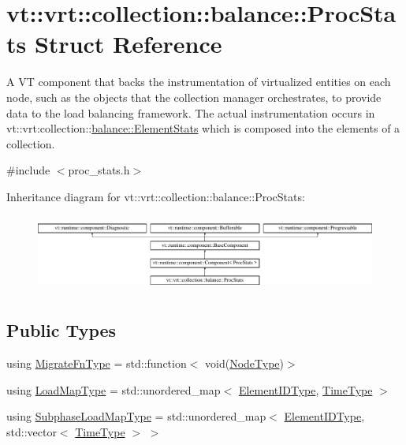 \hypertarget{structvt_1_1vrt_1_1collection_1_1balance_1_1_proc_stats}{}\section{vt\+:\+:vrt\+:\+:collection\+:\+:balance\+:\+:Proc\+Stats Struct Reference}
\label{structvt_1_1vrt_1_1collection_1_1balance_1_1_proc_stats}


A VT component that backs the instrumentation of virtualized entities on each node, such as the objects that the collection manager orchestrates, to provide data to the load balancing framework. The actual instrumentation occurs in {\ttfamily vt\+::vrt\+:collection\+:}\+:\hyperlink{structvt_1_1vrt_1_1collection_1_1balance_1_1_element_stats}{balance\+::\+Element\+Stats} which is composed into the elements of a collection.  




{\ttfamily \#include $<$proc\+\_\+stats.\+h$>$}

Inheritance diagram for vt\+:\+:vrt\+:\+:collection\+:\+:balance\+:\+:Proc\+Stats\+:\begin{figure}[H]
\begin{center}
\leavevmode
\includegraphics[height=2.565865cm]{structvt_1_1vrt_1_1collection_1_1balance_1_1_proc_stats}
\end{center}
\end{figure}
\subsection*{Public Types}
\begin{DoxyCompactItemize}
\item 
using \hyperlink{structvt_1_1vrt_1_1collection_1_1balance_1_1_proc_stats_a7cb065ac4de218cb717bc2634782f0cb}{Migrate\+Fn\+Type} = std\+::function$<$ void(\hyperlink{namespacevt_a866da9d0efc19c0a1ce79e9e492f47e2}{Node\+Type})$>$
\item 
using \hyperlink{structvt_1_1vrt_1_1collection_1_1balance_1_1_proc_stats_aa810fd21680061ec5d50f6526f66be31}{Load\+Map\+Type} = std\+::unordered\+\_\+map$<$ \hyperlink{namespacevt_1_1vrt_1_1collection_1_1balance_a14c8d2c972f2913aa3f1636e5be0a120}{Element\+I\+D\+Type}, \hyperlink{namespacevt_a876a9d0cd5a952859c72de8a46881442}{Time\+Type} $>$
\item 
using \hyperlink{structvt_1_1vrt_1_1collection_1_1balance_1_1_proc_stats_ab2312e47e475143cf295d45cb2493f48}{Subphase\+Load\+Map\+Type} = std\+::unordered\+\_\+map$<$ \hyperlink{namespacevt_1_1vrt_1_1collection_1_1balance_a14c8d2c972f2913aa3f1636e5be0a120}{Element\+I\+D\+Type}, std\+::vector$<$ \hyperlink{namespacevt_a876a9d0cd5a952859c72de8a46881442}{Time\+Type} $>$ $>$
\end{DoxyCompactItemize}
